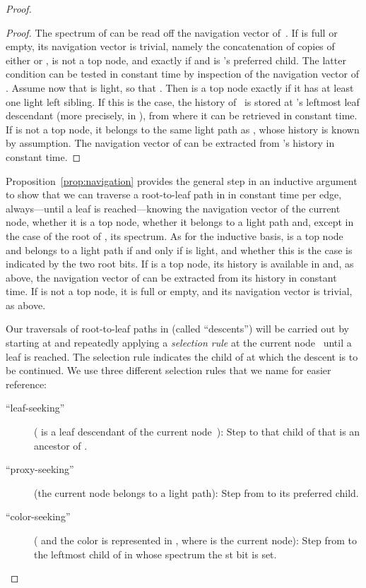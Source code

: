 \documentclass[envcountsame,envcountsect,undated,nolinenumbers]{lnthi}
\begin{document}
\begin{proof}
\begin{proof}
The spectrum of  can be read off the
navigation vector of~.
If  is full or empty, its navigation vector
is trivial, namely the concatenation of 
copies of either  or ,
 is not a top node, and 
exactly if  and  is
's preferred child.
The latter condition can be tested in constant
time by inspection of
the navigation vector of .
Assume now that  is light, so that .
Then  is a top node exactly
if it has at least one light
left sibling.
If this is the case, the history of~
is stored at 's leftmost leaf descendant 
(more precisely, in ),
from where it can be retrieved in constant time.
If  is not a top node, it belongs to the
same light path as ,
whose history is known by assumption.
The navigation vector of  can be extracted
from 's history in constant time.
\end{proof}

Proposition~\ref{prop:navigation} provides the general
step in an inductive argument to show that we can
traverse a root-to-leaf path in  in constant
time per edge, always---until a
leaf is reached---knowing
the navigation vector of the current node,
whether it is a top node,
whether it belongs to a light path and, except
in the case of the root  of ,
its spectrum.
As for the inductive basis, 
is a top node and belongs to a light
path if and only if  is light,
and whether this is the case is
indicated by the two root bits.
If  is a top node, its history
is available
in  and, as above, the navigation vector
of  can be extracted from its history in constant time.
If  is not a top node, it is full or empty,
and its navigation vector is trivial, as above.

Our traversals of root-to-leaf paths in 
(called ``descents'') will be carried out by
starting at  and repeatedly applying a
\emph{selection rule} at the current node~
until a leaf is reached.
The selection rule indicates the child of 
at which the descent is to be continued.
We use three different selection rules that
we name for easier reference:

\begin{description}
\item[{\normalfont``leaf-seeking''}]
( is a leaf descendant of the current node~):
Step to that child of  that is an
ancestor of .
\item[{\normalfont``proxy-seeking''}]
(the current node  belongs to a light path):
Step from  to its
preferred child.
\item[{\normalfont``color-seeking''}]
( and
the color  is represented in ,
where  is the current node):
Step from  to the leftmost child of 
in whose spectrum the st bit is set.
\end{description}


\end{proof}
\end{document}
